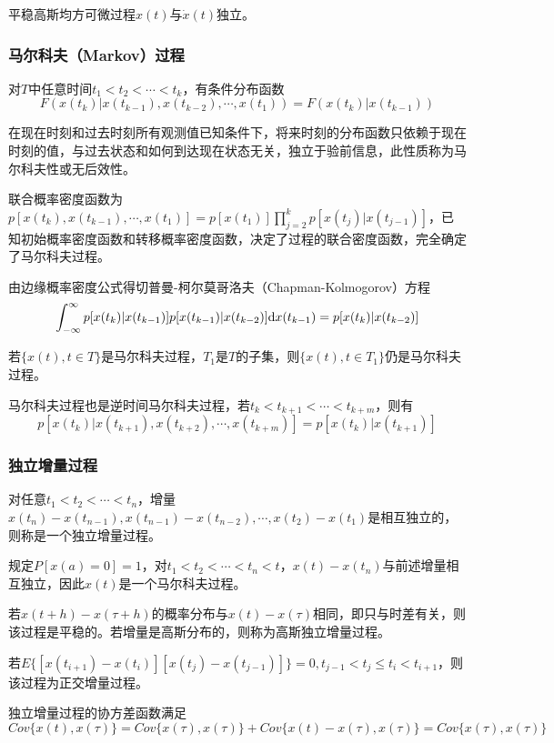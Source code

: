 \documentclass[11pt,a4paper]{ctexart}
\renewcommand{\d}{{\rm d}}
\begin{document}
            平稳高斯均方可微过程$x(t)$与$\dot x(t)$独立。
        \subsubsection{马尔科夫（Markov）过程}
            对$T$中任意时间$t_1<t_2<\cdots<t_k$，有条件分布函数
            \[
            F(x(t_k)|x(t_{k-1}),x(t_{k-2}),\cdots,x(t_1))=F(x(t_k)|x(t_{k-1}))
            \]
            
            在现在时刻和过去时刻所有观测值已知条件下，将来时刻的分布函数只依赖于现在时刻的值，与过去状态和如何到达现在状态无关，独立于验前信息，此性质称为马尔科夫性或无后效性。

            联合概率密度函数为$p[x(t_k),x(t_{k-1}),\cdots,x(t_1)]=p[x(t_1)]\prod\limits_{j=2}^kp[x(t_j)|x(t_{j-1})]$，已知初始概率密度函数和转移概率密度函数，决定了过程的联合密度函数，完全确定了马尔科夫过程。

            由边缘概率密度公式得切普曼-柯尔莫哥洛夫（Chapman-Kolmogorov）方程
            \[
            \int_{-\infty}^{\infty}p[x(t_k)|x(t_{k-1})]p[x(t_{k-1})|x(t_{k-2})]\d x(t_{k-1})=p[x(t_k)|x(t_{k-2})]
            \]

            若$\{x(t),t\in T\}$是马尔科夫过程，$T_1$是$T$的子集，则$\{x(t),t\in T_1\}$仍是马尔科夫过程。

            马尔科夫过程也是逆时间马尔科夫过程，若$t_k<t_{k+1}<\cdots<t_{k+m}$，则有
            \[
            p[x(t_k)|x(t_{k+1}),x(t_{k+2}),\cdots,x(t_{k+m})]=p[x(t_k)|x(t_{k+1})]
            \]
        \subsubsection{独立增量过程}
            对任意$t_1<t_2<\cdots<t_n$，增量$x(t_n)-x(t_{n-1}),x(t_{n-1})-x(t_{n-2}),\cdots,x(t_2)-x(t_1)$是相互独立的，则称是一个独立增量过程。

            规定$P[x(a)=0]=1$，对$t_1<t_2<\cdots<t_n<t$，$x(t)-x(t_n)$与前述增量相互独立，因此$x(t)$是一个马尔科夫过程。

            若$x(t+h)-x(\tau+h)$的概率分布与$x(t)-x(\tau)$相同，即只与时差有关，则该过程是平稳的。若增量是高斯分布的，则称为高斯独立增量过程。

            若$E\{[x(t_{i+1})-x(t_i)][x(t_j)-x(t_{j-1})]\}=0,t_{j-1}<t_j\leqslant t_i<t_{i+1}$，则该过程为正交增量过程。

            独立增量过程的协方差函数满足
            \[
            Cov\{x(t),x(\tau)\}=Cov\{x(\tau),x(\tau)\}+Cov\{x(t)-x(\tau),x(\tau)\}=Cov\{x(\tau),x(\tau)\}
            \]
\end{document}
